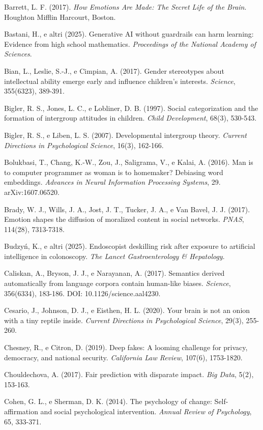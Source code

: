 Barrett, L. F. (2017). \textit{How Emotions Are Made: The Secret Life of the Brain}. Houghton Mifflin Harcourt, Boston.

Bastani, H., e altri (2025). Generative AI without guardrails can harm learning: Evidence from high school mathematics. \textit{Proceedings of the National Academy of Sciences}.

Bian, L., Leslie, S.-J., e Cimpian, A. (2017). Gender stereotypes about intellectual ability emerge early and influence children's interests. \textit{Science}, 355(6323), 389-391.

Bigler, R. S., Jones, L. C., e Lobliner, D. B. (1997). Social categorization and the formation of intergroup attitudes in children. \textit{Child Development}, 68(3), 530-543.

Bigler, R. S., e Liben, L. S. (2007). Developmental intergroup theory. \textit{Current Directions in Psychological Science}, 16(3), 162-166.

Bolukbasi, T., Chang, K.-W., Zou, J., Saligrama, V., e Kalai, A. (2016). Man is to computer programmer as woman is to homemaker? Debiasing word embeddings. \textit{Advances in Neural Information Processing Systems}, 29. arXiv:1607.06520.

Brady, W. J., Wills, J. A., Jost, J. T., Tucker, J. A., e Van Bavel, J. J. (2017). Emotion shapes the diffusion of moralized content in social networks. \textit{PNAS}, 114(28), 7313-7318.

Budzyń, K., e altri (2025). Endoscopist deskilling risk after exposure to artificial intelligence in colonoscopy. \textit{The Lancet Gastroenterology \& Hepatology}.

Caliskan, A., Bryson, J. J., e Narayanan, A. (2017). Semantics derived automatically from language corpora contain human-like biases. \textit{Science}, 356(6334), 183-186. DOI: 10.1126/science.aal4230.

Cesario, J., Johnson, D. J., e Eisthen, H. L. (2020). Your brain is not an onion with a tiny reptile inside. \textit{Current Directions in Psychological Science}, 29(3), 255-260.

Chesney, R., e Citron, D. (2019). Deep fakes: A looming challenge for privacy, democracy, and national security. \textit{California Law Review}, 107(6), 1753-1820.

Chouldechova, A. (2017). Fair prediction with disparate impact. \textit{Big Data}, 5(2), 153-163.

Cohen, G. L., e Sherman, D. K. (2014). The psychology of change: Self-affirmation and social psychological intervention. \textit{Annual Review of Psychology}, 65, 333-371.

